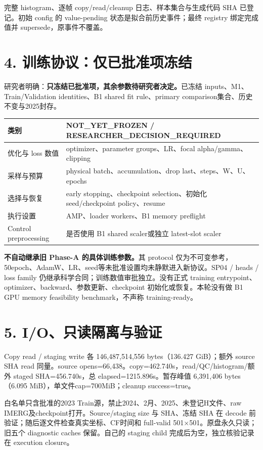 \documentclass[11pt,a4paper,fontset=windows]{ctexart}
\begin{document}
完整 histogram、逐帧 copy/read/cleanup 日志、样本集合与生成代码 SHA 已登记。初始 config 的 value-pending 状态是拟合前历史事件；最终 registry 绑定完成值并 supersede，原事件不覆盖。
\newpage
\section*{4. 训练协议：仅已批准项冻结}
研究者明确：\textbf{只冻结已批准项，其余参数待研究者决定。}已冻结 inputs、M1、Train/Validation identities、B1 shared fit rule、primary comparison集合、历史不变与2025封存。

\begin{tabularx}{\linewidth}{lX}\toprule
类别 & NOT\_YET\_FROZEN / RESEARCHER\_DECISION\_REQUIRED\\\midrule
优化与 loss 数值 & optimizer、parameter groups、LR、focal alpha/gamma、clipping\\
采样与预算 & physical batch、accumulation、drop last、steps、W、U、epochs\\
选择与恢复 & early stopping、checkpoint selection、初始化 seed/checkpoint policy、resume\\
执行设置 & AMP、loader workers、B1 memory preflight\\
Control preprocessing & 是否使用 B1 shared scaler或独立 latest-slot scaler\\\bottomrule
\end{tabularx}

\textbf{不自动继承旧 Phase-A 的具体训练参数。}其 protocol 仅为不可变参考，50epoch、AdamW、LR、seed等未批准设置均未静默进入新协议。SP04 / heads / loss family 仍继承科学合同；训练数值审批独立。没有正式 training entrypoint、optimizer、backward、参数更新、checkpoint 初始化或恢复。本轮没有做 B1 GPU memory feasibility benchmark，不声称 training-ready。
\section*{5. I/O、只读隔离与验证}
Copy read / staging write 各 146,487,514,556 bytes（136.427 GiB）；额外 source SHA read 同量。source opens=66,438。copy=462.740s，read/QC/histogram/额外 staged SHA=456.740s，总 elapsed=1215.896s。暂存峰值 6,391,406 bytes（6.095 MiB），单文件cap=700MiB；cleanup success=true。

白名单只含批准的2023 Train源，禁止2024、2月、2025、未登记H文件、raw IMERG及checkpoint打开。Source/staging size 与 SHA、冻结 SHA 在 decode 前验证；随后逐文件检查真实坐标、CF时间和 full-valid 501$\times$501。原盘永久只读；旧五个 diagnostic caches 保留。自己的 staging child 完成后为空，独立核验记录在 execution closure。
\end{document}

